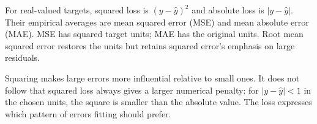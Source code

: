 For real-valued targets, squared loss is $(y-\hat y)^2$ and absolute loss is $|y-\hat y|$. Their empirical averages are mean squared error (MSE) and mean absolute error (MAE). MSE has squared target units; MAE has the original units. Root mean squared error restores the units but retains squared error's emphasis on large residuals.

Squaring makes large errors more influential relative to small ones. It does not follow that squared loss always gives a larger numerical penalty: for $|y-\hat y|<1$ in the chosen units, the square is smaller than the absolute value. The loss expresses which pattern of errors fitting should prefer.

\par\addvspace{\intextsep}\noindent\begin{minipage}{\linewidth}
\centering
{}
\label{fig:mse-vs-mae}
\end{minipage}\par\addvspace{\intextsep}


